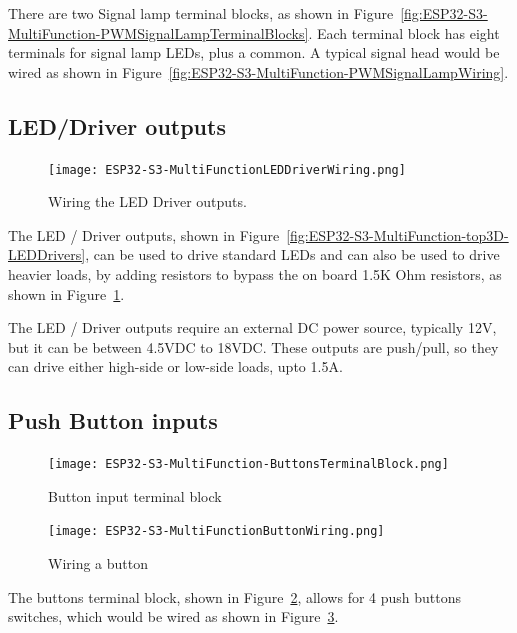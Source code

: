 There are two Signal lamp terminal blocks, as shown in 
Figure~\ref{fig:ESP32-S3-MultiFunction-PWMSignalLampTerminalBlocks}. Each 
terminal block has eight terminals for signal lamp LEDs, plus a common.  A 
typical signal head would be wired as shown in 
Figure~\ref{fig:ESP32-S3-MultiFunction-PWMSignalLampWiring}.

\subsection{LED/Driver outputs}
\begin{figure}[hbpt]\begin{centering}%
\texttt{[image: ESP32-S3-MultiFunctionLEDDriverWiring.png]}
\caption{Wiring the LED Driver outputs.}
\label{fig:ESP32-S3-MultiFunctionLEDDriverWiring}
\end{centering}\end{figure}

The LED / Driver outputs, shown in 
Figure~\ref{fig:ESP32-S3-MultiFunction-top3D-LEDDrivers}, can be used to drive 
standard LEDs and can also be used to drive heavier loads, by adding resistors 
to bypass the on board 1.5K Ohm resistors, as shown in 
Figure~\ref{fig:ESP32-S3-MultiFunctionLEDDriverWiring}.

The LED / Driver outputs require an external DC power source, typically 12V,
but it can be between 4.5VDC to 18VDC. These outputs are push/pull, so they
can drive either high-side or low-side loads, upto 1.5A.

\subsection{Push Button inputs}
\begin{figure}[hbpt]\begin{centering}%
\texttt{[image: ESP32-S3-MultiFunction-ButtonsTerminalBlock.png]}
\caption{Button input terminal block}
\label{fig:ESP32-S3-MultiFunction-ButtonsTerminalBlock}
\end{centering}\end{figure}
\begin{figure}[hbpt]\begin{centering}%
\texttt{[image: ESP32-S3-MultiFunctionButtonWiring.png]}
\caption{Wiring a button}
\label{fig:ESP32-S3-MultiFunctionButtonWiring}
\end{centering}\end{figure}

The buttons terminal block, shown in 
Figure~\ref{fig:ESP32-S3-MultiFunction-ButtonsTerminalBlock}, allows for 4 
push buttons switches, which would be wired as shown in 
Figure~\ref{fig:ESP32-S3-MultiFunctionButtonWiring}.

